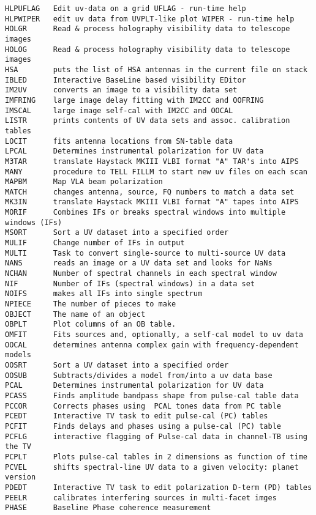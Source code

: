 \begin{verbatim}
HLPUFLAG   Edit uv-data on a grid UFLAG - run-time help
HLPWIPER   edit uv data from UVPLT-like plot WIPER - run-time help
HOLGR      Read & process holography visibility data to telescope images
HOLOG      Read & process holography visibility data to telescope images
HSA        puts the list of HSA antennas in the current file on stack
IBLED      Interactive BaseLine based visibility EDitor
IM2UV      converts an image to a visibility data set
IMFRING    large image delay fitting with IM2CC and OOFRING
IMSCAL     large image self-cal with IM2CC and OOCAL
LISTR      prints contents of UV data sets and assoc. calibration tables
LOCIT      fits antenna locations from SN-table data
LPCAL      Determines instrumental polarization for UV data
M3TAR      translate Haystack MKIII VLBI format "A" TAR's into AIPS
MANY       procedure to TELL FILLM to start new uv files on each scan
MAPBM      Map VLA beam polarization
MATCH      changes antenna, source, FQ numbers to match a data set
MK3IN      translate Haystack MKIII VLBI format "A" tapes into AIPS
MORIF      Combines IFs or breaks spectral windows into multiple windows (IFs)
MSORT      Sort a UV dataset into a specified order
MULIF      Change number of IFs in output
MULTI      Task to convert single-source to multi-source UV data
NANS       reads an image or a UV data set and looks for NaNs
NCHAN      Number of spectral channels in each spectral window
NIF        Number of IFs (spectral windows) in a data set
NOIFS      makes all IFs into single spectrum
NPIECE     The number of pieces to make
OBJECT     The name of an object
OBPLT      Plot columns of an OB table.
OMFIT      Fits sources and, optionally, a self-cal model to uv data
OOCAL      determines antenna complex gain with frequency-dependent models
OOSRT      Sort a UV dataset into a specified order
OOSUB      Subtracts/divides a model from/into a uv data base
PCAL       Determines instrumental polarization for UV data
PCASS      Finds amplitude bandpass shape from pulse-cal table data
PCCOR      Corrects phases using  PCAL tones data from PC table
PCEDT      Interactive TV task to edit pulse-cal (PC) tables
PCFIT      Finds delays and phases using a pulse-cal (PC) table
PCFLG      interactive flagging of Pulse-cal data in channel-TB using the TV
PCPLT      Plots pulse-cal tables in 2 dimensions as function of time
PCVEL      shifts spectral-line UV data to a given velocity: planet version
PDEDT      Interactive TV task to edit polarization D-term (PD) tables
PEELR      calibrates interfering sources in multi-facet imges
PHASE      Baseline Phase coherence measurement

\end{verbatim}
